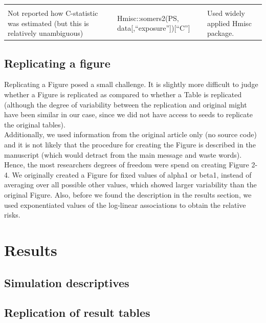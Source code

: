 \documentclass[10,a4paperpaper,]{article}
\begin{document}
\begin{longtable}[]{@{}lll@{}}
\begin{minipage}[t]{0.25\columnwidth}
\strut
\end{minipage}\tabularnewline
\begin{minipage}[t]{0.33\columnwidth}\raggedright
Not reported how C-statistic was estimated (but this is relatively
unambiguous)\strut
\end{minipage} & \begin{minipage}[t]{0.33\columnwidth}\raggedright
Hmisc::somers2(PS, data{[},``exposure''{]}){[}``C''{]}\strut
\end{minipage} & \begin{minipage}[t]{0.25\columnwidth}\raggedright
Used widely applied Hmisc package.\strut
\end{minipage}\tabularnewline
\bottomrule
\end{longtable}

\subsection{Replicating a figure}

Replicating a Figure posed a small challenge. It is slightly more
difficult to judge whether a Figure is replicated as compared to whether
a Table is replicated (although the degree of variability between the
replication and original might have been similar in our case, since we
did not have access to seeds to replicate the original tables).\\
Additionally, we used information from the original article only (no
source code) and it is not likely that the procedure for creating the
Figure is described in the manuscript (which would detract from the main
message and waste words). Hence, the most researchers degrees of freedom
were spend on creating Figure 2-4. We originally created a Figure for
fixed values of alpha1 or beta1, instead of averaging over all possible
other values, which showed larger variability than the original Figure.
Also, before we found the description in the results section, we used
exponentiated values of the log-linear associations to obtain the
relative risks.

\section{Results}

\subsection{Simulation descriptives}

\subsection{Replication of result tables}
\end{document}
